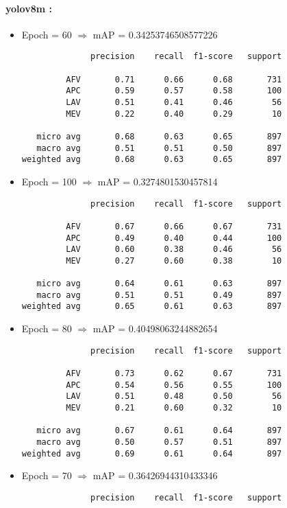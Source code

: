 \paragraph{yolov8m :}
\begin{itemize}
    \item Epoch = 60 $\Rightarrow$ mAP = 0.34253746508577226
          \begin{verbatim}
              precision    recall  f1-score   support

         AFV       0.71      0.66      0.68       731
         APC       0.59      0.57      0.58       100
         LAV       0.51      0.41      0.46        56
         MEV       0.22      0.40      0.29        10

   micro avg       0.68      0.63      0.65       897
   macro avg       0.51      0.51      0.50       897
weighted avg       0.68      0.63      0.65       897
    \end{verbatim}

    \item Epoch = 100 $\Rightarrow$ mAP = 0.3274801530457814
          \begin{verbatim}
              precision    recall  f1-score   support

         AFV       0.67      0.66      0.67       731
         APC       0.49      0.40      0.44       100
         LAV       0.60      0.38      0.46        56
         MEV       0.27      0.60      0.38        10

   micro avg       0.64      0.61      0.63       897
   macro avg       0.51      0.51      0.49       897
weighted avg       0.65      0.61      0.63       897
    \end{verbatim}

    \item Epoch = 80 $\Rightarrow$ mAP = 0.40498063244882654
          \begin{verbatim}
              precision    recall  f1-score   support

         AFV       0.73      0.62      0.67       731
         APC       0.54      0.56      0.55       100
         LAV       0.51      0.48      0.50        56
         MEV       0.21      0.60      0.32        10

   micro avg       0.67      0.61      0.64       897
   macro avg       0.50      0.57      0.51       897
weighted avg       0.69      0.61      0.64       897
    \end{verbatim}

    \item Epoch = 70 $\Rightarrow$ mAP = 0.36426944310433346
          \begin{verbatim}
              precision    recall  f1-score   support


\end{verbatim}
\end{itemize}
